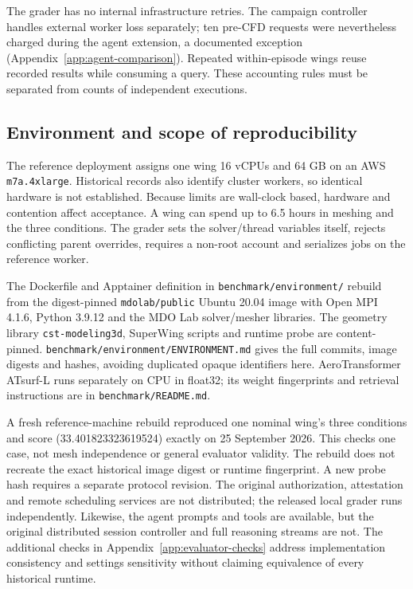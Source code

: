 The grader has no internal infrastructure retries. The campaign controller
handles external worker loss separately; ten pre-CFD requests were nevertheless
charged during the agent extension, a documented exception
(Appendix~\ref{app:agent-comparison}). Repeated within-episode wings reuse
recorded results while consuming a query. These accounting rules must be
separated from counts of independent executions.

\subsection{Environment and scope of reproducibility}

The reference deployment assigns one wing 16 vCPUs and 64 GB on an AWS
\texttt{m7a.4xlarge}. Historical records also identify cluster workers, so
identical hardware is not established. Because limits are wall-clock based,
hardware and contention affect acceptance. A wing can spend up to 6.5 hours
in meshing and the three conditions. The grader sets the solver/thread
variables itself, rejects conflicting parent overrides, requires a non-root
account and serializes jobs on the reference worker.

The Dockerfile and Apptainer definition in \texttt{benchmark/environment/}
rebuild from the digest-pinned \texttt{mdolab/public} Ubuntu 20.04 image with
Open MPI 4.1.6, Python 3.9.12 and the MDO Lab solver/mesher libraries. The
geometry library \texttt{cst-modeling3d}, SuperWing scripts and runtime probe
are content-pinned. \texttt{benchmark/environment/ENVIRONMENT.md} gives the
full commits, image digests and hashes, avoiding duplicated opaque identifiers
here. AeroTransformer ATsurf-L runs separately on CPU in float32; its weight
fingerprints and retrieval instructions are in \texttt{benchmark/README.md}.

A fresh reference-machine rebuild reproduced one nominal wing's three
conditions and score (33.401823323619524) exactly on 25 September 2026.
This checks one case, not mesh independence or general evaluator validity.
The rebuild does not recreate the exact historical image digest or runtime
fingerprint. A new probe hash requires a separate protocol revision. The
original authorization, attestation and remote scheduling services are not
distributed; the released local grader runs independently. Likewise, the
agent prompts and tools are available, but the original distributed session
controller and full reasoning streams are not. The additional checks in
Appendix~\ref{app:evaluator-checks} address implementation consistency and
settings sensitivity without claiming equivalence of every historical runtime.
